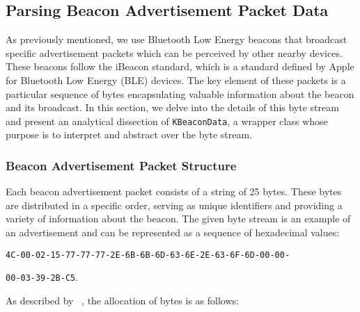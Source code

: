 \subsection{Parsing Beacon Advertisement Packet Data}

As previously mentioned, we use Bluetooth Low Energy beacons that broadcast specific advertisement packets which can be perceived by other nearby devices. These beacons follow the iBeacon standard, which is a standard defined by Apple for Bluetooth Low Energy (BLE) devices.\cite{apple2023ibeacon}
The key element of these packets is a particular sequence of bytes encapsulating valuable information about the beacon and its broadcast. 
In this section, we delve into the details of this byte stream and present an analytical dissection of \texttt{KBeaconData}, a wrapper class whose purpose is to interpret and abstract over the byte stream.

\subsubsection{Beacon Advertisement Packet Structure}
	 
Each beacon advertisement packet consists of a string of 25 bytes.
These bytes are distributed in a specific order, serving as unique identifiers and providing a variety of information about the beacon. 
The given byte stream is an example of an advertisement and can be represented as a sequence of hexadecimal values:


\noindent\texttt{4C-00-02-15-77-77-77-2E-6B-6B-6D-63-6E-2E-63-6F-6D-00-00-}


\noindent\texttt{00-03-39-2B-C5}.


As described by \citeauthor{apple2023ibeacon}~\cite{apple2023ibeacon}, the allocation of bytes is as follows:

